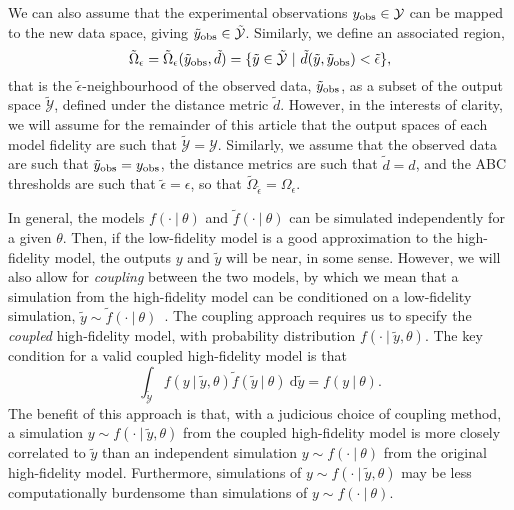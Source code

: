 \documentclass[review]{siamonline190516}
\begin{document}
We can also assume that the experimental observations $y_{\mathrm{obs}} \in \mathcal Y$ can be mapped to the new data space, giving $\tilde y_{\mathrm{obs}} \in \tilde{\mathcal Y}$.
Similarly, we define an associated region,
\[
 \tilde \Omega_{\epsilon} = \tilde \Omega_{\epsilon} (\tilde y_{\mathrm{obs}}, \tilde d) = \{ \tilde y \in \tilde{\mathcal Y} ~|~ \tilde d(\tilde y,\tilde y_{\mathrm{obs}}) < \tilde \epsilon \},
\]
that is the $\tilde \epsilon$-neighbourhood of the observed data, $\tilde y_{\mathrm{obs}}$, as a subset of the output space $\tilde{\mathcal Y}$, defined under the distance metric $\tilde d$.
However, in the interests of clarity, we will assume for the remainder of this article that the output spaces of each model fidelity are such that $\tilde{\mathcal Y} = \mathcal Y$.
Similarly, we assume that the observed data are such that $\tilde y_{\mathrm{obs}} = y_{\mathrm{obs}}$, the distance metrics are such that $\tilde d = d$, and the ABC thresholds are such that $\tilde \epsilon = \epsilon$, so that $\tilde \Omega_{\tilde \epsilon} = \Omega_\epsilon$.

In general, the models $f(\cdot~|~\theta)$ and $\tilde f(\cdot~|~\theta)$ can be simulated independently for a given $\theta$.
Then, if the low-fidelity model is a good approximation to the high-fidelity model, the outputs $y$ and $\tilde y$ will be near, in some sense.
However, we will also allow for \emph{coupling} between the two models, 
by which we mean that a simulation from the high-fidelity model can be conditioned on a low-fidelity simulation, $\tilde y \sim \tilde f(\cdot~|~\theta)$~\cite{Giles2008}.
The coupling approach requires us to specify the \emph{coupled} high-fidelity model, with probability distribution $f(\cdot~|~\tilde y, \theta)$.
The key condition for a valid coupled high-fidelity model is that
\begin{equation}
\label{eq:coupling}
 \int_{\tilde{\mathcal{Y}}} f(y ~|~ \tilde y, \theta) \tilde f(\tilde y~|~\theta) ~\mathrm d\tilde y = f(y ~|~ \theta).
\end{equation}
The benefit of this approach is that, with a judicious choice of coupling method, a simulation $y \sim f(\cdot~|~\tilde y, \theta)$ from the coupled high-fidelity model is more closely correlated to $\tilde y$ than an independent simulation $y \sim f(\cdot~|~\theta)$ from the original high-fidelity model.
Furthermore, simulations of $y \sim f(\cdot~|~\tilde y, \theta)$ may be less computationally burdensome than simulations of $y \sim f(\cdot~|~\theta)$.
\end{document}
